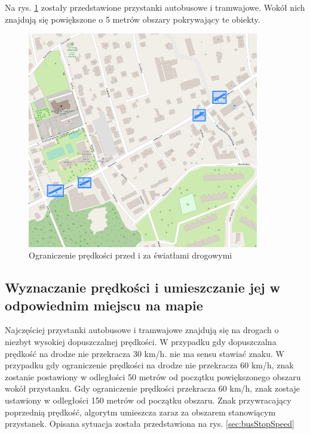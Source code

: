 Na rys. \ref{sec:busStopBorder} zostały przedstawione przystanki autobusowe i tramwajowe. Wokół nich znajdują się powiększone o 5 metrów obszary pokrywający te obiekty.
\begin{figure}[h]
\caption{Ograniczenie prędkości przed i za światłami drogowymi}
\label{sec:busStopBorder}
\centering
\includegraphics[width=0.9\textwidth]{busStopBorder}
\end{figure}


\newpage
\subsection{Wyznaczanie prędkości i umieszczanie jej w odpowiednim miejscu na mapie}

Najczęściej przystanki autobusowe i tramwajowe znajdują się na drogach o niezbyt wysokiej dopuszczalnej prędkości. W przypadku gdy dopuszczalna prędkość na drodze nie przekracza 30 km/h. nie ma sensu stawiać znaku. W przypadku gdy ograniczenie prędkości na drodze nie przekracza 60 km/h, znak zostanie postawiony w odległości 50 metrów od początku powiększonego obszaru wokół przystanku. Gdy ograniczenie prędkości przekracza 60 km/h, znak zostaje ustawiony w odległości 150 metrów od początku obszaru. 
Znak przywracający poprzednią prędkość, algorytm umieszcza zaraz za obszarem stanowiącym przystanek. Opisana sytuacja została przedstawiona na rys. \ref{sec:busStopSpeed}

